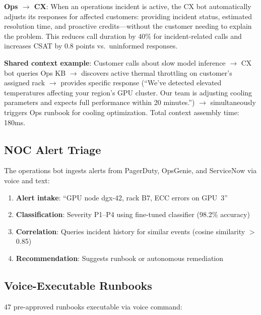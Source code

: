 \documentclass[conference,10pt]{IEEEtran}
\begin{document}
\textbf{Ops $\to$ CX}: When an operations incident is active, the CX bot automatically adjusts its responses for affected customers: providing incident status, estimated resolution time, and proactive credits---without the customer needing to explain the problem. This reduces call duration by 40\% for incident-related calls and increases CSAT by 0.8 points vs.\ uninformed responses.

\textbf{Shared context example}: Customer calls about slow model inference $\to$ CX bot queries Ops KB $\to$ discovers active thermal throttling on customer's assigned rack $\to$ provides specific response (``We've detected elevated temperatures affecting your region's GPU cluster. Our team is adjusting cooling parameters and expects full performance within 20 minutes.'') $\to$ simultaneously triggers Ops runbook for cooling optimization. Total context assembly time: 180ms.


\subsection{NOC Alert Triage}

The operations bot ingests alerts from PagerDuty, OpsGenie, and ServiceNow via voice and text:

\begin{enumerate}
\item \textbf{Alert intake}: ``GPU node dgx-42, rack B7, ECC errors on GPU~3''
\item \textbf{Classification}: Severity P1--P4 using fine-tuned classifier (98.2\% accuracy)
\item \textbf{Correlation}: Queries incident history for similar events (cosine similarity $>$0.85)
\item \textbf{Recommendation}: Suggests runbook or autonomous remediation
\end{enumerate}

\subsection{Voice-Executable Runbooks}

47 pre-approved runbooks executable via voice command:
\end{document}
